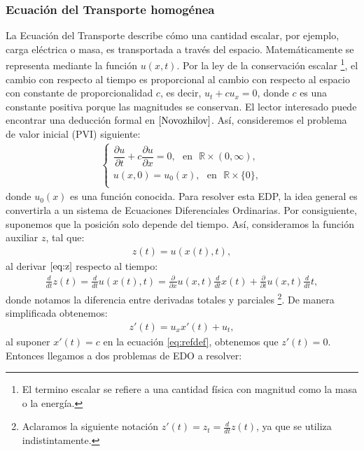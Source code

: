 \documentclass[12pt]{article}
\theoremstyle{definition}
\newcommand*{\field}[1]{\mathbb{#1}}
\begin{document}
\subsubsection{Ecuación del Transporte homogénea}
\noindent
La Ecuación del Transporte describe cómo una cantidad escalar, por ejemplo, carga eléctrica o masa, es transportada a través del espacio. Matemáticamente se representa mediante la función $u(x,t)$. Por la ley de la conservación escalar \footnote{El termino escalar se refiere a una cantidad física con magnitud como la masa o la energía.}, el cambio con respecto al tiempo es proporcional al cambio con respecto al espacio con constante de proporcionalidad $c$, es decir, $u_{t}+cu_{x}=0$, donde $c$ es una constante positiva porque las magnitudes se conservan. El lector interesado puede encontrar una deducción formal en $\cite{Novozhilov}$. Así, consideremos el problema de valor inicial (PVI) siguiente:
\begin{align}
         \left\{ \begin{array}{ll}
         \dfrac{\partial u}{\partial t} + c \dfrac{\partial u}{\partial x} = 0,\:\:\:\text{en}\:\:\: \field{R} \times (0,\infty) ,\\
         u(x,0) = u_{0}(x), \:\:\:\text{en}\:\:\: \field{R} \times \{0\},\\
         \end{array}  \label{eq:HomoTransport}
\right.
\end{align}
donde $u_{0}(x)$ es una función conocida. Para resolver esta EDP, la idea general es convertirla a un sistema de Ecuaciones Diferenciales Ordinarias. Por consiguiente, suponemos que la posición solo depende del tiempo. Así, consideramos la función auxiliar $z$, tal que:
\begin{align}
    z(t) = u(x(t),t),
    \label{eq:z}
\end{align}
al derivar $\eqref{eq:z}$ respecto al tiempo:
\begin{align*}
    \frac{d}{dt}z(t) = \frac{d}{dt}u(x(t),t) = \frac{\partial}{\partial x}u(x,t)\frac{d}{dt}x(t) + \frac{\partial}{\partial t}u(x,t)\frac{d}{dt}t,
\end{align*}
donde notamos la diferencia entre derivadas totales y parciales \footnote{Aclaramos la siguiente notación $z'(t) = z_{t} = \frac{d}{dt}z(t)$, ya que se utiliza indistintamente.}. De manera simplificada obtenemos:
\begin{align}
    z'(t) = u_{x}x'(t) + u_{t},
    \label{eq:refdef}
\end{align}
al suponer $x'(t) = c$ en la ecuación \eqref{eq:refdef}, obtenemos que $z'(t)=0$. Entonces llegamos a dos problemas de EDO a resolver:
\end{document}

